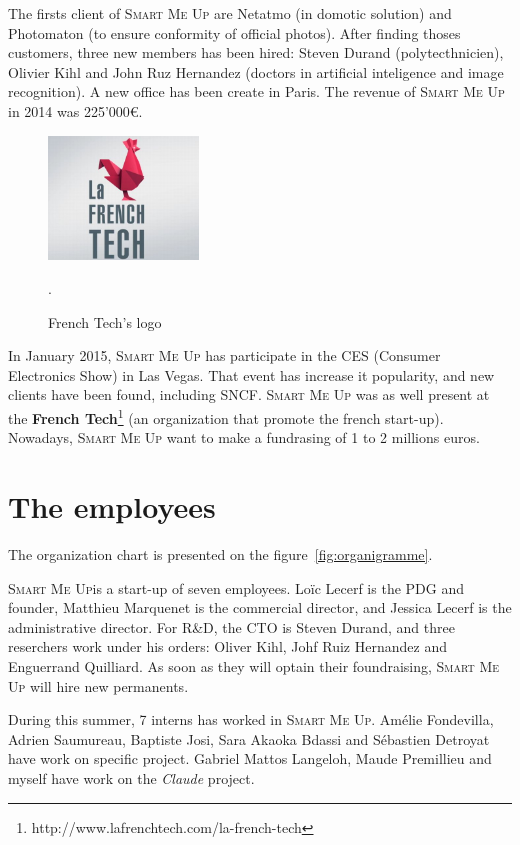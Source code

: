 \documentclass[a4paper,11pt]{custom}
\newcommand{\smu}{\textsc{Smart Me Up}}
\newcommand{\claude}{\textit{Claude}}
\begin{document}
The firsts client of \smu{} are Netatmo (in domotic solution) and Photomaton (to
ensure conformity of official photos). After finding thoses customers, three new
members has been hired: Steven Durand (polytecthnicien), Olivier Kihl and John
Ruz Hernandez (doctors in artificial inteligence and image recognition). A new
office has been create in Paris. The revenue of \smu{} in 2014 was 225'000\euro.

\begin{figure}
  \centering
  \includegraphics[width=4cm]{french-tech.jpg}
  \label{fig:frenchtech}
  \caption{French Tech's logo}.
\end{figure}

In January 2015, \smu{} has participate in the CES (Consumer Electronics Show) in
Las Vegas. That event has increase it popularity, and new clients have been
found, including SNCF. \smu{} was as well present at the \textbf{French
Tech}\footnote{http://www.lafrenchtech.com/la-french-tech}
(an organization that promote the french start-up). Nowadays, \smu{} want to
make a fundrasing of 1 to 2 millions euros.

\section{The employees}

The organization chart is presented on the figure~\ref{fig:organigramme}.

\smu is a start-up of seven employees. Loïc Lecerf is the PDG and founder,
Matthieu Marquenet is the commercial director, and Jessica Lecerf is the
administrative director. For R\&D, the CTO is Steven Durand, and three
reserchers work under his orders: Oliver Kihl, Johf Ruiz Hernandez and
Enguerrand Quilliard. As soon as they will optain their foundraising, \smu{}
will hire new permanents.

During this summer, 7 interns has worked in \smu. Amélie Fondevilla, Adrien
Saumureau, Baptiste Josi, Sara Akaoka Bdassi and Sébastien Detroyat have work on
specific project. Gabriel Mattos Langeloh, Maude Premillieu and myself have work
on the \claude{} project.
\end{document}
